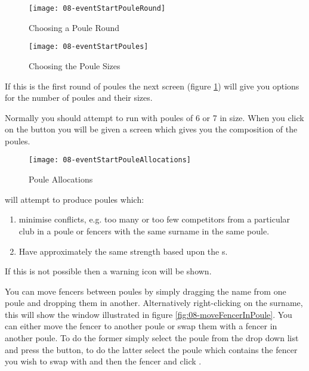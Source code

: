 \documentclass[a4paper,11pt]{memoir}
\begin{document}
\begin{figure}[!ht]
 \centering
 \begin{minipage}{0.4\textwidth}
  \centering
  \texttt{[image: 08-eventStartPouleRound]}
  \caption{Choosing a Poule Round} \label{fig:08-eventStartPouleRound}
 \end{minipage}
 \hfill
 \begin{minipage}{0.4\textwidth}
   \centering
   \texttt{[image: 08-eventStartPoules]}
  \caption{Choosing the Poule Sizes} \label{fig:08-eventStartPoules}
 \end{minipage}
\end{figure}

If this is the first round of poules the next screen (figure \ref{fig:08-eventStartPoules}) will give you options for the number of poules and their sizes. 

Normally you should attempt to run with poules of 6 or 7 in size. When you click on the  button you will be given a screen which gives you the composition of the poules.

\begin{figure}[!ht]
 \centering
 \texttt{[image: 08-eventStartPouleAllocations]}
 \caption{Poule Allocations} \label{fig:08-eventStartPouleAllocations}
\end{figure}

\fencingtime{} will attempt to produce poules which:

\begin{enumerate}
 \item minimise conflicts, e.g. too many or too few competitors from a particular club in a poule or fencers with the same surname in the same poule.
 \item Have approximately the same strength based upon the s.
\end{enumerate}

If this is not possible then a warning icon will be shown. 

You can move fencers between poules by simply dragging the name from one poule and dropping them in another. Alternatively right-clicking on the surname, this will show the window illustrated in figure \ref{fig:08-moveFencerInPoule}. You can either move the fencer to another poule or swap them with a fencer in another poule. To do the former simply select the poule from the drop down list and press the  button, to do the latter select the poule which contains the fencer you wish to swap with and then the fencer and click .
\end{document}
